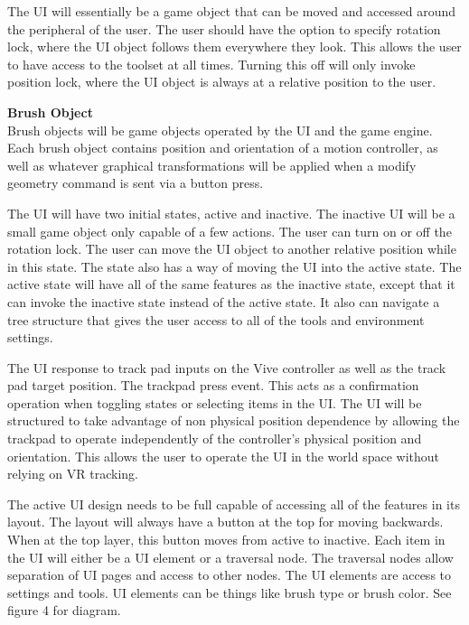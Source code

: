 \documentclass[onecolumn, draftclsnofoot,10pt, compsoc]{IEEEtran}
\newcounter{threesection}[subsubsection]
\newcounter{foursection}[threesection]
\begin{document}
The UI will essentially be a game object that can be moved and accessed around the peripheral of the user. The user should have the option to specify rotation lock, where the UI object follows them everywhere they look. This allows the user to have access to the toolset at all times. Turning this off will only invoke position lock, where the UI object is always at a relative position to the user. 

\textbf{Brush Object} \\
Brush objects will be game objects operated by the UI and the game engine. Each brush object contains position and orientation of a motion controller, as well as whatever graphical transformations will be applied when a modify geometry command is sent via a button press.

The UI will have two initial states, active and inactive. The inactive UI will be a small game object only capable of a few actions. The user can turn on or off the rotation lock. The user can move the UI object to another relative position while in this state. The state also has a way of moving the UI into the active state. 
The active state will have all of the same features as the inactive state, except that it can invoke the inactive state instead of the active state. It also can navigate a tree structure that gives the user access to all of the tools and environment settings. 

The UI response to track pad inputs on the Vive controller as well as the track pad target position. The trackpad press event. This acts as a confirmation operation when toggling states or selecting items in the UI. The UI will be structured to take advantage of non physical position dependence by allowing the trackpad to operate independently of the controller's physical position and orientation. This allows the user to operate the UI in the world space without relying on VR tracking.

The active UI design needs to be full capable of accessing all of the features in its layout. The layout will always have a button at the top for moving backwards. When at the top layer, this button moves from active to inactive. Each item in the UI will either be a UI element or a traversal node. The traversal nodes allow separation of UI pages and access to other nodes. The UI elements are access to settings and tools. UI elements can be things like brush type or brush color. See figure 4 for diagram.
\end{document}

